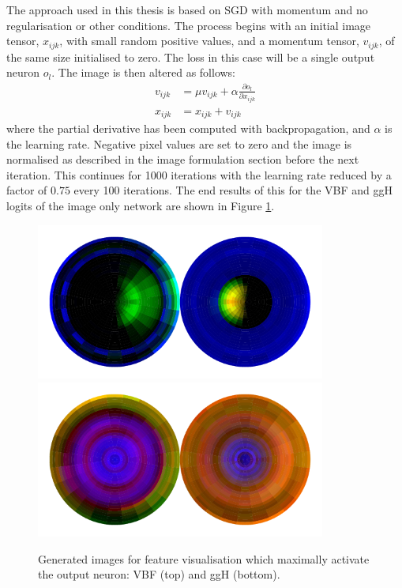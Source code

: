 The approach used in this thesis is based on SGD with momentum and no regularisation or other conditions. 
The process begins with an initial image tensor, $x_{ijk}$, with small random positive values, and a momentum tensor, $v_{ijk}$, of the same size initialised to zero.
The loss in this case will be a single output neuron $o_{l}$. The image is then altered as follows:
\begin{equation}
    \begin{split}
        v_{ijk} &= \mu{}v_{ijk} + \alpha\frac{\partial{o_{l}}}{\partial{x_{ijk}}} \\
        x_{ijk} &= x_{ijk} + v_{ijk}
    \end{split}
\end{equation} 
where the partial derivative has been computed with backpropagation, and $\alpha$ is the learning rate. Negative pixel values are set to zero and the image is normalised as described in the image formulation section before the next iteration. This continues for 1000 iterations with the learning rate reduced by a factor of $0.75$ every 100 iterations. 
The end results of this for the VBF and ggH logits of the image only network are shown in Figure \ref{fig:event_categorisation:feature_vis_vbf_ggh}.
\begin{figure}[h!]
    \centering
    \includegraphics[width=0.85\textwidth]{figures/event_selection/norm_logits1.pdf}
    \includegraphics[width=0.85\textwidth]{figures/event_selection/norm_logits0.pdf}
    \caption{Generated images for feature visualisation which maximally activate the output neuron: VBF (top) and ggH (bottom).}
    \label{fig:event_categorisation:feature_vis_vbf_ggh}
\end{figure}

